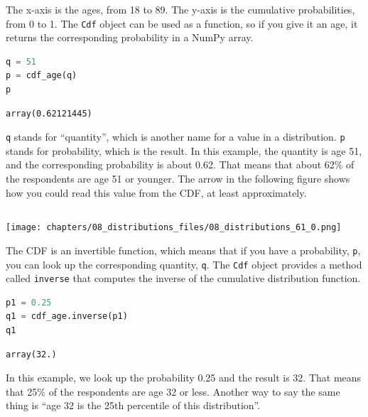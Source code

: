 The x-axis is the ages, from 18 to 89. The y-axis is the cumulative
probabilities, from 0 to 1. The \passthrough{\lstinline!Cdf!} object can
be used as a function, so if you give it an age, it returns the
corresponding probability in a NumPy array.

\begin{lstlisting}[language=Python,style=source]
q = 51
p = cdf_age(q)
p
\end{lstlisting}

\begin{lstlisting}[style=output]
array(0.62121445)
\end{lstlisting}

\passthrough{\lstinline!q!} stands for ``quantity'', which is another
name for a value in a distribution. \passthrough{\lstinline!p!} stands
for probability, which is the result. In this example, the quantity is
age 51, and the corresponding probability is about 0.62. That means that
about 62\% of the respondents are age 51 or younger. The arrow in the
following figure shows how you could read this value from the CDF, at
least approximately.

\begin{lstlisting}[language=Python,style=source]
\end{lstlisting}

\begin{center}
\texttt{[image: chapters/08\_distributions\_files/08\_distributions\_61\_0.png]}
\end{center}

The CDF is an invertible function, which means that if you have a
probability, \passthrough{\lstinline!p!}, you can look up the
corresponding quantity, \passthrough{\lstinline!q!}. The
\passthrough{\lstinline!Cdf!} object provides a method called
\passthrough{\lstinline!inverse!} that computes the inverse of the
cumulative distribution function.

\begin{lstlisting}[language=Python,style=source]
p1 = 0.25
q1 = cdf_age.inverse(p1)
q1
\end{lstlisting}

\begin{lstlisting}[style=output]
array(32.)
\end{lstlisting}

In this example, we look up the probability 0.25 and the result is 32.
That means that 25\% of the respondents are age 32 or less. Another way
to say the same thing is ``age 32 is the 25th percentile of this
distribution''.

